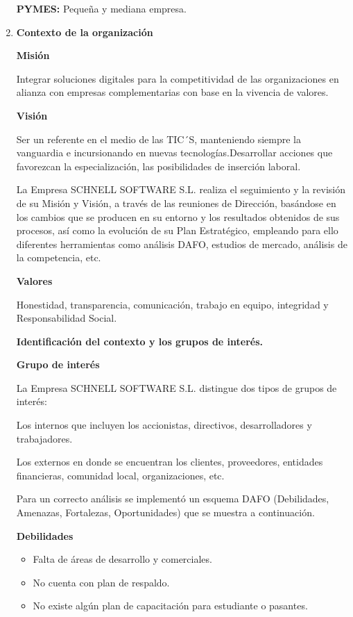 \documentclass[10pt,a4paper]{article}
\begin{document}
\begin{enumerate}
\textbf{PYMES: }Pequeña y mediana empresa.

\item \textbf{Contexto de la organización}

\textbf{Misión}

Integrar soluciones digitales para la competitividad de las organizaciones en alianza con empresas complementarias con base en la vivencia de valores.

\textbf{Visión}

Ser un referente en el medio de las TIC´S, manteniendo siempre la vanguardia e incursionando en nuevas tecnologías.Desarrollar acciones que favorezcan la especialización, las posibilidades de inserción laboral.

La Empresa SCHNELL SOFTWARE S.L. realiza el seguimiento y la revisión de su Misión y Visión, a través de las reuniones de
Dirección, basándose en los cambios que se producen en su entorno y los resultados obtenidos de sus procesos, así como la evolución de su Plan Estratégico, empleando para ello diferentes herramientas como análisis DAFO, estudios de mercado, análisis de la competencia, etc.

\textbf{Valores}

Honestidad, transparencia, comunicación, trabajo en equipo, integridad y Responsabilidad Social.

\textbf{Identificación del contexto y los grupos de interés.}

\textbf{Grupo de interés}

La Empresa SCHNELL SOFTWARE S.L. distingue dos tipos de grupos de interés:

Los internos que incluyen los accionistas, directivos, desarrolladores y trabajadores.

Los externos en donde se encuentran los clientes, proveedores, entidades financieras, comunidad local, organizaciones, etc.

Para un correcto análisis se implementó un esquema DAFO (Debilidades, Amenazas, Fortalezas, Oportunidades) que se muestra a continuación.

\textbf{Debilidades}

\begin{itemize}
\item Falta de áreas de desarrollo y comerciales.
\item No cuenta con plan de respaldo.
\item No existe algún plan de capacitación para estudiante o pasantes.
\end{itemize}


\end{enumerate}
\end{document}
